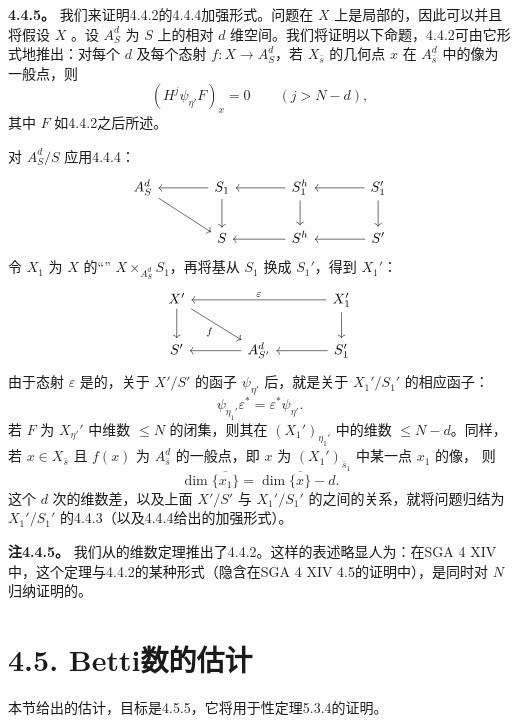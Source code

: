 \par\medskip\noindent\textbf{4.4.5。} 我们来证明4.4.2的4.4.4加强形式。问题在 $X$ 上是局部的，因此可以并且将假设 $X$ 。设 $A_S^d$ 为 $S$ 上的相对 $d$ 维空间。我们将证明以下命题，4.4.2可由它形式地推出：对每个 $d$ 及每个态射 $f:X\to A_S^d$，若 $X_{\bar s}$ 的几何点 $x$ 在 $A_{\bar s}^d$ 中的像为一般点，则
\[(H^j\psi_{\eta'}F)_x=0\qquad(j>N-d),\]
其中 $F$ 如4.4.2之后所述。

对 $A_S^d/S$ 应用4.4.4：
\[
\begin{tikzcd}[ampersand replacement=\&,column sep=large]
A_S^d\arrow[dr]\&S_1\arrow[l]\arrow[d]\&S_1^h\arrow[l]\arrow[d]\&S_1'\arrow[l]\arrow[d]\\
\&S\&S^h\arrow[l]\&S'\arrow[l]
\end{tikzcd}
\]
令 $X_1$ 为 $X$ 的“” $X\times_{A_S^d}S_1$，再将基从 $S_1$ 换成 $S_1'$，得到 $X_1'$：
\[
\begin{tikzcd}[ampersand replacement=\&,column sep=large]
X'\arrow[d]\arrow[dr,"{f}"']\&\&X_1'\arrow[ll,"{\varepsilon}"']\arrow[d]\\
S'\&A_{S'}^d\arrow[l]\&S_1'\arrow[l]
\end{tikzcd}
\]
由于态射 $\varepsilon$ 是的，关于 $X'/S'$ 的函子 $\psi_{\eta'}$ 后，就是关于 $X_1'/S_1'$ 的相应函子：
\[\psi_{\eta_1'}\varepsilon^*=\varepsilon^*\psi_{\eta'}.\]
若 $F$ 为 $X_{\eta'}'$ 中维数 $\le N$ 的闭集，则其在 $(X_1')_{\eta_1'}$ 中的维数 $\le N-d$。同样，若 $x\in X_{\bar s}$ 且 $f(x)$ 为 $A_{\bar s}^d$ 的一般点，即 $x$ 为 $(X_1')_{\bar s_1}$ 中某一点 $x_1$ 的像，
则
\[\dim\overline{\{x_1\}}=\dim\overline{\{x\}}-d.\]
这个 $d$ 次的维数差，以及上面 $X'/S'$ 与 $X_1'/S_1'$ 的之间的关系，就将问题归结为 $X_1'/S_1'$ 的4.4.3（以及4.4.4给出的加强形式）。

\par\medskip\noindent\textbf{注4.4.5。} 我们从的维数定理推出了4.4.2。这样的表述略显人为：在SGA 4 XIV中，这个定理与4.4.2的某种形式（隐含在SGA 4 XIV 4.5的证明中），是同时对 $N$ 归纳证明的。

\section*{4.5. Betti数的估计}
本节给出的估计，目标是4.5.5，它将用于性定理5.3.4的证明。

